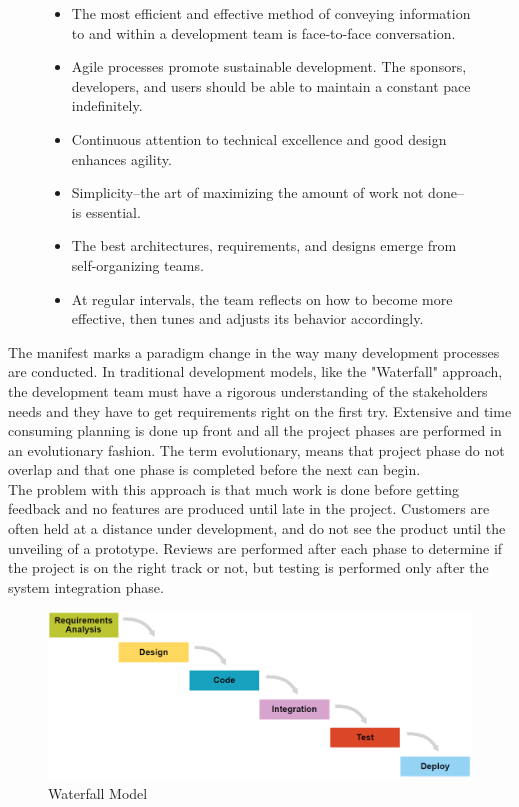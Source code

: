 \begin{figure}[h]
\begin{minipage}[t]{0.3\textwidth}
    \textbf{}
        \begin{itemize}
            \item The most efficient and effective method of 
                conveying information to and within a development 
                team is face-to-face conversation.
            \item Agile processes promote sustainable development. 
                    The sponsors, developers, and users should be able 
                 to maintain a constant pace indefinitely.
            \item Continuous attention to technical excellence 
                    and good design enhances agility.
            \item Simplicity--the art of maximizing the amount 
                    of work not done--is essential.
            \item The best architectures, requirements, and designs 
                    emerge from self-organizing teams.
            \item At regular intervals, the team reflects on how 
               to become more effective, then tunes and adjusts 
               its behavior accordingly.
        \end{itemize}
    \end{minipage}
\end{figure}


\newpage

The manifest marks a paradigm change in the way many development processes are conducted. 
In traditional development models, like the "Waterfall" approach, the development team must have a rigorous understanding of the stakeholders needs and they have to get requirements right on the first try. Extensive and time consuming planning is done up front and all the project phases are performed in an evolutionary fashion. The term evolutionary, means that project phase do not overlap and that one phase is completed before the next can begin.  
\\
The problem with this approach is that much work is done before getting feedback and no features are produced until late in the project. Customers are often held at a distance under development, and do not see the product until the unveiling of a prototype. Reviews are performed after each phase to determine if the project is on the right track or not, but testing is performed only after the system integration phase. 
\begin{figure} [H]
 \includegraphics{VAPIQ-PICTURES/WaterFall.PNG}
 \caption*{Waterfall Model}
\end{figure} 

